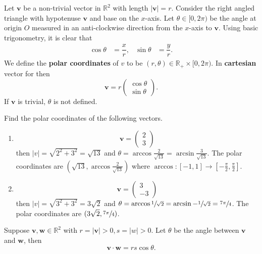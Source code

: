 \begin{definition}
    Let $\bm v$ be a non-trivial vector in $\mathbb R^2$ with length $|\bm v|=r$. Consider the right angled triangle with hypotenuse $\bm v$ and base on the $x$-axis. Let $\theta\in[0,2\pi)$ be the angle at origin $O$ measured in an anti-clockwise direction from the $x$-axis to $\bm v$. Using basic trigonometry, it is clear that
    \begin{align*}
        \cos\theta&=\dfrac xr,&\sin\theta&=\dfrac yr.
    \end{align*}
    We define the \textbf{polar coordinates} of $v$ to be $(r,\theta)\in\mathbb R_+\times[0,2\pi)$. In \textbf{cartesian} vector for then
    \[
        \bm v=r
        \begin{pmatrix}
            \cos\theta\\
            \sin\theta
        \end{pmatrix}.
    \]
    If $\bm v$ is trivial, $\theta$ is not defined.
\end{definition}

\begin{example}
    Find the polar coordinates of the following vectors.
    \begin{enumerate}
        \item
        \[
            \bm v=
            \begin{pmatrix}
                2\\
                3
            \end{pmatrix}
        \]
        then $|v|=\sqrt{2^2+3^2}=\sqrt{13}$ and $\theta=\arccos{\frac 2{\sqrt{13}}}=\arcsin{\frac 3{\sqrt{13}}}$. The polar coordinates are $(\sqrt{13}, \arccos{\frac2{\sqrt{13}}})$ where $\arccos:[-1,1]\to [-\frac\pi2,\frac\pi2]$.
        
        \item
        \[
            \bm v=
            \begin{pmatrix}
                3\\
                -3
            \end{pmatrix}
        \]
        then $|v|=\sqrt{3^2+3^2}=3\sqrt{2}$ and $\theta=\arccos{\sfrac1{\sqrt 2}}=\arcsin{-\sfrac1{\sqrt 2}}=\sfrac{7\pi}4$. The polar coordinates are $(3\sqrt 2, \sfrac{7\pi}4)$.
    \end{enumerate}
\end{example}

\begin{lemma}
    Suppose $\bm v,\bm w\in\mathbb R^2$ with $r=|\bm v|>0, s=|w|>0$. Let $\theta$ be the angle between $\bm v$ and $\bm w$, then
    \[
            \bm v\cdot\bm w=rs\cos\theta.
    \]
\end{lemma}

